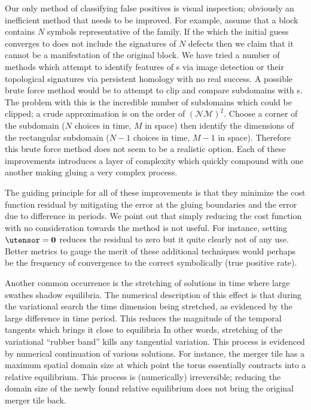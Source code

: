 Our only method of classifying false positives is visual inspection;
obviously an inefficient method that needs to be improved.
For example, assume that a {block}
contains $N$ symbols representative of the {} family. If the {\po}
which the initial guess converges to does not include the signatures of $N$
defects then we claim that it cannot be a manifestation of the original {block}.
We have tried a number of methods which
attempt to identify features of {\fpo}s via image detection
or their topological signatures via persistent homology with
no real success. A possible brute force method would be to attempt to clip
and compare subdomains with {\fpo}s. The problem with this
is the incredible number of subdomains which could be clipped; a crude
approximation is on the order of $\mathcal{(NM)^2}$. Choose a corner
of the subdomain ($N$ choices in time, $M$ in space) then identify the
dimensions of the rectangular subdomain ($N-1$ choices in time, $M-1$ in space).
Therefore this brute force method does not seem to be a realistic option.
Each of these improvements introduces a layer of complexity which
quickly compound with one another making gluing a very complex process.

The guiding principle for all of these improvements
is that they minimize the cost function residual  by
mitigating the error at the gluing boundaries and the error due to difference
in periods. We point out that simply reducing the cost function with no consideration
towards the method is not useful. For instance,
setting $\utensor=\mathbf{0}$ reduces the residual to zero but it quite clearly not of any use.
Better metrics to gauge the merit of these additional techniques would perhaps be
the frequency of convergence to the correct {\po} symbolically (true positive rate).

Another common occurrence is the stretching of solutions in time where large swathes shadow
equilibria. The numerical description of this effect is that during the variational search
the time dimension being stretched, as evidenced by the large difference in time
period. This reduces the magnitude of the temporal tangents which
brings it close to equilibria In other words, stretching of the
variational ``rubber band'' kills any tangential variation. This process
is evidenced by numerical continuation of various solutions. For instance,
the merger tile has a maximum spatial domain size at which point the torus
essentially contracts into a relative equilibrium. This process is (numerically) irreversible;
reducing the domain size of the newly found relative equilibrium does not
bring the original merger tile back.

